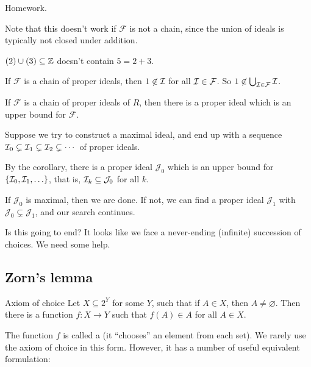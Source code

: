 \documentclass[12pt,letterpaper]{report}
\begin{document}
\begin{thmproof}
  Homework.
\end{thmproof}

Note that this doesn't work if $\mathcal{F}$ is not a chain, since the union of ideals is typically
not closed under addition.

\begin{ex}
  $(2) \cup (3) \subseteq \mathbb{Z}$ doesn't contain $5 = 2 + 3$.
\end{ex}

If $\mathcal{F}$ is a chain of proper ideals, then $1 \not\in \mathcal{I}$ for all
$\mathcal{I} \in \mathcal{F}$.
So $1 \not\in \bigcup_{\mathcal{I} \in \mathcal{F}} \mathcal{I}$.

\begin{cor}{}{}
  If $\mathcal{F}$ is a chain of proper ideals of $R$, then there is a proper ideal which is an
  upper bound for $\mathcal{F}$.
\end{cor}

Suppose we try to construct a maximal ideal, and end up with a sequence
$\mathcal{I}_0 \subsetneq \mathcal{I}_1 \subsetneq \mathcal{I}_2 \subsetneq \cdots$ of proper ideals.

By the corollary, there is a proper ideal $\mathcal{J}_0$ which is an upper bound for
$\{\mathcal{I}_0, \mathcal{I}_1, \ldots\}$, that is, $\mathcal{I}_k \subseteq \mathcal{J}_0$ for all $k$.

If $\mathcal{J}_0$ is maximal, then we are done.
If not, we can find a proper ideal $\mathcal{J}_1$ with $\mathcal{J}_0 \subsetneq \mathcal{J}_1$,
and our search continues.

Is this going to end?
It looks like we face a never-ending (infinite) succession of choices.
We need some help.

\pagebreak
\subsection{Zorn's lemma}

\begin{axiom}{Axiom of choice}{}
  Let $X \subseteq 2^Y$ for some $Y$, such that if $A \in X$, then $A \neq \varnothing$.
  Then there is a function $f \colon X \to Y$ such that $f(A) \in A$ for all $A \in X$.
\end{axiom}

The function $f$ is called a  (it ``chooses'' an element from each set).
We rarely use the axiom of choice in this form.
However, it has a number of useful equivalent formulation:
\end{document}
